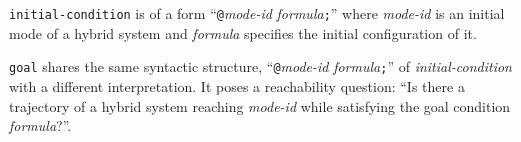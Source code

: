 \texttt{initial-condition} is of a form
``\texttt{@}\textit{mode-id} \textit{formula}\texttt{;}''
where \textit{mode-id} is an initial mode of a hybrid system and
\textit{formula} specifies the initial configuration of it.

\texttt{goal} shares the same syntactic structure,
``\texttt{@}\textit{mode-id} \textit{formula}\texttt{;}'' of
\textit{initial-condition} with a different interpretation. It poses a
reachability question: ``Is there a trajectory of a hybrid system
reaching \textit{mode-id} while satisfying the goal condition \textit{formula}?''.

